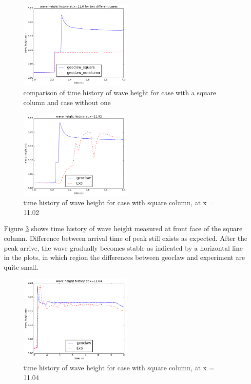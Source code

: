 \documentclass[11pt]{article}
\begin{document}
\begin{figure}[h!]
    \centering
    \includegraphics[width=0.5\textwidth]{./plots/waveheight_x11_comparison}
    \caption{comparison of time history of wave height for case with a square column and case without one}
    \label{fig:waveheight_x11_comparison}
\end{figure}
\begin{figure}[h!]
    \centering
    \includegraphics[width=0.5\textwidth]{./plots/waveheight_square_x1102}
    \caption{time history of wave height for case with square column, at x = 11.02}
    \label{fig:waveheight_square_x=11.02}
\end{figure}
\par
Figure \ref{fig:waveheight_square_x=11.04} shows time history of wave height measured at front face of the square column. 
Difference between arrival time of peak still exists as expected. After the peak arrive, the wave gradually becomes stable as indicated by a horizontal line in the plots, in which region the differences between geoclaw and experiment are quite small. 
\begin{figure}[h!]
    \centering
    \includegraphics[width=0.5\textwidth]{./plots/waveheight_square_x1104_largerTimeRange}
    \caption{time history of wave height for case with square column, at x = 11.04}
    \label{fig:waveheight_square_x=11.04}
\end{figure}
\end{document}
